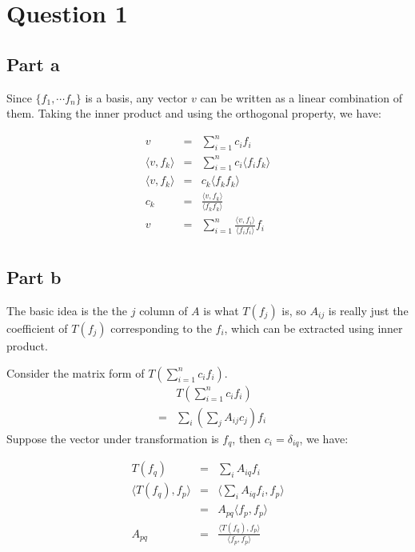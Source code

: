 \section*{Question 1}
\subsection*{Part a}
Since $ \{ f_1, \cdots f_n \}$ is a basis, any vector $ v $ can be written as a linear combination of them. Taking the inner product and using the orthogonal property, we have:

\begin{eqnarray*}
  v &=& \sum\limits_{i=1}^n c_i f_i \\
  \langle v, f_k \rangle &=& \sum\limits_{i=1}^n c_i \langle f_i f_k \rangle \\
  \langle v, f_k \rangle &=& c_k \langle f_k f_k \rangle \\  
  c_k &=& \frac{\langle v, f_k \rangle}{\langle f_k f_k \rangle } \\
    v &=& \sum\limits_{i=1}^n \frac{\langle v, f_i \rangle}{\langle f_i f_i \rangle } f_i \\
\end{eqnarray*}

\subsection*{Part b}
The basic idea is the the $ j $ column of $ A $ is what $ T(f_j) $ is, so $ A_{ij} $ is really just the coefficient of $ T(f_j) $ corresponding to the $ f_i $, which can be extracted using inner product.

Consider the matrix form of $ T(\sum\limits_{i=1}^n c_i f_i) $. 
\begin{eqnarray*}
  & & T(\sum\limits_{i=1}^n c_i f_i) \\
  &=& \sum\limits_i (\sum\limits_j A_{ij} c_j) f_i
\end{eqnarray*}
Suppose the vector under transformation is $ f_q $, then $ c_i = \delta_{iq} $, we have:

\begin{eqnarray*}
                       T(f_q) &=& \sum\limits_i A_{iq} f_i \\
  \langle T(f_q), f_p \rangle &=& \langle \sum\limits_i A_{iq} f_i, f_p \rangle \\
                              &=& A_{pq}\langle f_p, f_p \rangle \\
                       A_{pq} &=& \frac{\langle T(f_q), f_p \rangle}{\langle f_p, f_p \rangle}
\end{eqnarray*}

